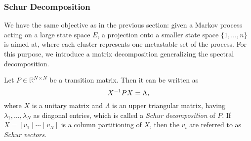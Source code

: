 



\subsubsection*{Schur Decomposition} %

We have the same objective as in the previous section: given a Markov process acting on a large state space $E$, a projection onto a smaller state space $\{1,\dots,n\}$ is aimed at, where each cluster represents one metastable set of the process.
For this purpose, we introduce a matrix decomposition generalizing the spectral decomposition. %

\begin{defi}
Let $P \in \mathbb{R}^{N \times N}$ be a transition matrix. Then it can be written as
\begin{equation}
\label{eq:def_schur}
X^{-1} PX = \Lambda,
\end{equation}
where $X$ is a unitary matrix and $\Lambda$ is an upper triangular matrix, having $\lambda_1, \dots, \lambda_N$ as diagonal entries, which is called a \textit{Schur decomposition} of $P$.
If $X = [v_1 \mid \cdots \mid v_N]$ is a column partitioning of $X$, then the $v_i$ are referred to as \textit{Schur vectors}.
\end{defi}

